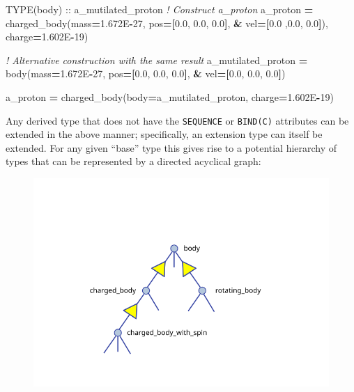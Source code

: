 \documentclass[
  paper=a4,
  ,captions=tableheading
]{scrartcl}
\newenvironment{Shaded}{\begin{snugshade}}{\end{snugshade}}
\newcommand{\CommentTok}[1]{\textcolor[rgb]{0.56,0.35,0.01}{\textit{#1}}}
\newcommand{\DataTypeTok}[1]{\textcolor[rgb]{0.13,0.29,0.53}{#1}}
\newcommand{\DecValTok}[1]{\textcolor[rgb]{0.00,0.00,0.81}{#1}}
\newcommand{\FloatTok}[1]{\textcolor[rgb]{0.00,0.00,0.81}{#1}}
\newcommand{\KeywordTok}[1]{\textcolor[rgb]{0.13,0.29,0.53}{\textbf{#1}}}
\newcommand{\NormalTok}[1]{#1}
\begin{document}
\begin{Shaded}
\begin{Highlighting}[]
\DataTypeTok{TYPE(body)} \DataTypeTok{::}\NormalTok{ a\_mutilated\_proton}
\CommentTok{! Construct a\_proton}
\NormalTok{a\_proton }\KeywordTok{=}\NormalTok{ charged\_body(mass}\KeywordTok{=}\FloatTok{1.672}\NormalTok{E}\KeywordTok{{-}}\DecValTok{27}\NormalTok{, pos}\KeywordTok{=[}\FloatTok{0.0}\NormalTok{, }\FloatTok{0.0}\NormalTok{, }\FloatTok{0.0}\KeywordTok{]}\NormalTok{, }\KeywordTok{\&}
\NormalTok{                        vel}\KeywordTok{=[}\FloatTok{0.0}\NormalTok{ ,}\FloatTok{0.0}\NormalTok{, }\FloatTok{0.0}\KeywordTok{]}\NormalTok{), charge}\KeywordTok{=}\FloatTok{1.602}\NormalTok{E}\KeywordTok{{-}}\DecValTok{19}\NormalTok{)}

\CommentTok{! Alternative construction with the same result}
\NormalTok{a\_mutilated\_proton }\KeywordTok{=}\NormalTok{ body(mass}\KeywordTok{=}\FloatTok{1.672}\NormalTok{E}\KeywordTok{{-}}\DecValTok{27}\NormalTok{, pos}\KeywordTok{=[}\FloatTok{0.0}\NormalTok{, }\FloatTok{0.0}\NormalTok{, }\FloatTok{0.0}\KeywordTok{]}\NormalTok{, }\KeywordTok{\&}
\NormalTok{                          vel}\KeywordTok{=[}\FloatTok{0.0}\NormalTok{, }\FloatTok{0.0}\NormalTok{, }\FloatTok{0.0}\KeywordTok{]}\NormalTok{)}

\NormalTok{a\_proton }\KeywordTok{=}\NormalTok{ charged\_body(body}\KeywordTok{=}\NormalTok{a\_mutilated\_proton, charge}\KeywordTok{=}\FloatTok{1.602}\NormalTok{E}\KeywordTok{{-}}\DecValTok{19}\NormalTok{)}
\end{Highlighting}
\end{Shaded}

Any derived type that does not have the \texttt{SEQUENCE} or
\texttt{BIND(C)} attributes can be extended in the above manner;
specifically, an extension type can itself be extended. For any given
``base'' type this gives rise to a potential hierarchy of types that can
be represented by a directed acyclical graph:

\begin{figure}
\centering
\includegraphics[width=12cm,height=\textheight,keepaspectratio]{Inheritance_diagram.svg.png}
\caption{~}
\end{figure}
\end{document}
